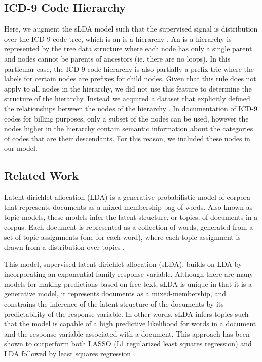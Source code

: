 \documentclass{article}
\begin{document}
\subsection{ICD-9 Code Hierarchy}

Here, we augment the sLDA model such that the supervised signal is
distribution over the ICD-9 code tree, which is an is-a hierarchy
\citep{ICD9NCBO}. An is-a hierarchy is represented by the tree data
structure where each node has only a single parent and nodes cannot
be parents of ancestors (ie. there are no loops). In this particular
case, the ICD-9 code hierarchy is also partially a prefix trie where
the labels for certain nodes are prefixes for child nodes. Given that
this rule does not apply to all nodes in the hierarchy, we did not
use this feature to determine the structure of the hierarchy. Instead
we acquired a dataset that explicitly defined the relationships between
the nodes of the hierarchy \citep{ICD9NCBO}. In documentation of
ICD-9 codes for billing purposes, only a subset of the nodes can be
used, however the nodes higher in the hierarchy contain semantic information
about the categories of codes that are their descendants. For this
reason, we included these nodes in our model.



\subsection{Related Work}

Latent dirichlet allocation (LDA) is a generative probabilistic model
of corpora that represents documents as a mixed membership bag-of-words.
Also known as topic models, these models infer the latent structure,
or topics, of documents in a corpus. Each document is represented
as a collection of words, generated from a set of topic assignments
(one for each word), where each topic assignment is drawn from a distribution
over topics \citep{Blei2003}.

This model, supervised latent dirichlet allocation (sLDA), builds
on LDA by incorporating an exponential family response variable. Although
there are many models for making predictions based on free text, sLDA
is unique in that it is a generative model, it represents documents
as a mixed-membership, and constrains the inference of the latent
structure of the documents by its predictability of the response variable.
In other words, sLDA infers topics such that the model is capable
of a high predictive likelihood for words in a document and the response
variable associated with a document. This approach has been shown
to outperform both LASSO (L1 regularized least squares regression)
and LDA followed by least squares regression \citep{BleiMcAuliffe2008}.
\end{document}
